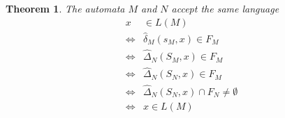 \documentclass[a4paper]{article}
\newtheorem{theorem}{Theorem}
\begin{document}
        \begin{theorem}
            The automata $M$ and $N$ accept the same language
            \begin{align*}
                x&\in L(M)\\
                \Leftrightarrow &\hat{\delta}_M(s_M,x)\in F_M\\
                \Leftrightarrow &\hat{\Delta}_N(S_M,x)\in F_M\\
                \Leftrightarrow &\hat{\Delta}_N(S_N,x)\in F_M\\
                \Leftrightarrow &\hat{\Delta}_N(S_N,x)\cap F_N \neq \emptyset\\
                \Leftrightarrow &x\in L(M)
            \end{align*}
        \end{theorem}
\end{document}
